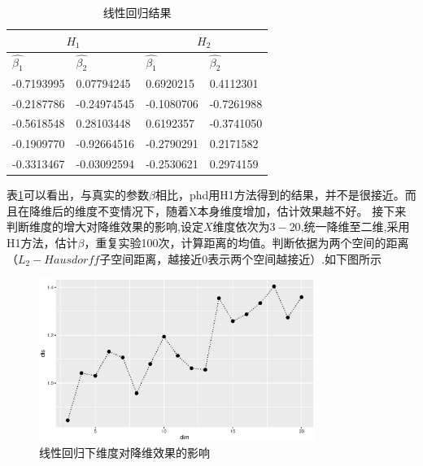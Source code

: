 \begin{table}[htbp]
\centering
\caption{线性回归结果}
\label{tab:norm}
\begin{tabular}{l|l|ll}
\hline
\multicolumn{2}{c|}{$H_1$} & \multicolumn{2}{c}{$H_2$}                    \\ \hline
$\hat{\beta_{1}}$&$\hat{\beta_{2}}$& \multicolumn{1}{l|}{$\hat{\beta_{1}}$}  &$\hat{\beta_{2}}$ \\ \hline
-0.7193995  & 0.07794245   & \multicolumn{1}{l|}{0.6920215}  & 0.4112301  \\ \hline
-0.2187786  & -0.24974545  & \multicolumn{1}{l|}{-0.1080706} & -0.7261988 \\ \hline
-0.5618548  & 0.28103448   & \multicolumn{1}{l|}{0.6192357}  & -0.3741050 \\ \hline
-0.1909770  & -0.92664516  & \multicolumn{1}{l|}{-0.2790291} & 0.2171582  \\ \hline
-0.3313467  & -0.03092594  & \multicolumn{1}{l|}{-0.2530621} & 0.2974159  \\ \hline
\end{tabular}
\end{table}
表\ref{tab:norm}可以看出，与真实的参数$\beta$相比，phd用H1方法得到的结果，并不是很接近。而且在降维后的维度不变情况下，随着X本身维度增加，估计效果越不好。
接下来判断维度的增大对降维效果的影响,设定$X$维度依次为$3-20$,统一降维至二维,采用H1方法，估计$\beta$，重复实验100次，计算距离的均值。判断依据为两个空间的距离（$L_2-Hausdorff$子空间距离，越接近0表示两个空间越接近）.如下图所示
\begin{figure}[H]
    \centering
    \includegraphics[width=0.8\textwidth]{image/norm.eps} 
    \caption{线性回归下维度对降维效果的影响}
\end{figure}


